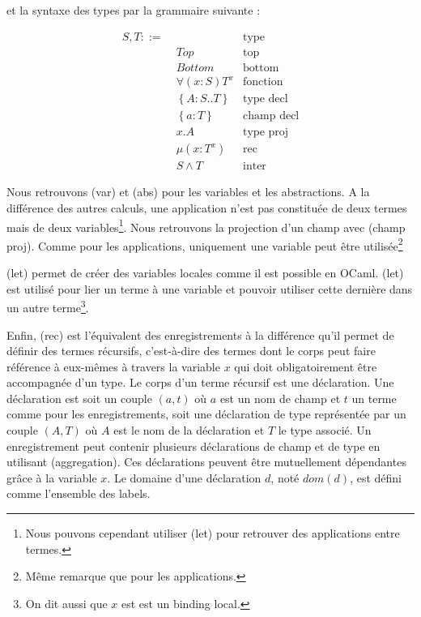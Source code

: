 et la syntaxe des types par la grammaire suivante :

\begin{align*}
  S, T ::= & \, & \text{type} \\
           & \; Top & \text{top} \\
           & \; Bottom & \text{bottom} \\
           & \; \forall(x : S) T^{x} & \text{fonction} \\
           & \; \left\{ A : S .. T \right\} & \text{type decl} \\
           & \; \left\{ a : T \right\} & \text{champ decl} \\
           & \; x.A & \text{type proj} \\
           & \; \mu(x : T^{x}) & \text{rec} \\
           & \; S \wedge T & \text{inter}
\end{align*}

Nous retrouvons (var) et (abs) pour les variables et les
abstractions.
A la différence des autres calculs, une application n'est pas constituée de deux
termes mais de deux variables\footnote{Nous pouvons cependant utiliser (let)
  pour retrouver des applications entre termes.}. Nous retrouvons la projection d'un champ avec
(champ proj). Comme pour les applications, uniquement une variable peut être
utilisée\footnote{Même remarque que pour les applications.}

(let) permet de créer des variables locales comme il est possible en OCaml.
(let) est utilisé pour lier un terme à une variable et pouvoir utiliser cette
dernière dans un autre terme\footnote{On dit aussi que $x$ est est un binding local.}.

Enfin, (rec) est l'équivalent des enregistrements à la différence qu'il permet
de définir des termes récursifs, c'est-à-dire des termes
dont le corps peut faire référence à eux-mêmes à travers la variable $x$ qui
doit obligatoirement être accompagnée d'un type. Le
corps d'un terme récursif est une déclaration. Une déclaration est soit un
couple $(a, t)$ où $a$ est un nom de champ et $t$ un terme comme pour les
enregistrements, soit une déclaration de type représentée par un couple $(A,
T)$ où $A$ est le nom de la déclaration et $T$ le type associé. Un enregistrement peut contenir plusieurs déclarations de champ et
de type en utilisant (aggregation). Ces déclarations peuvent être mutuellement
dépendantes grâce à la variable $x$.
Le domaine d'une déclaration $d$, noté $dom(d)$, est défini comme l'ensemble des
labels.

